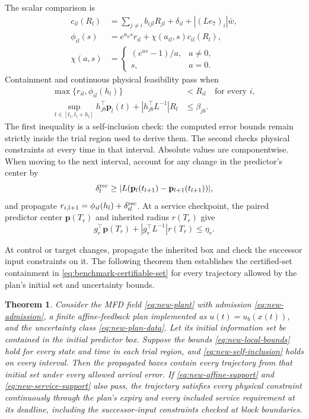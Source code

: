 \documentclass[preprint,12pt]{elsarticle}
\theoremstyle{definition}
\theoremstyle{plain}
\newtheorem{theorem}{Theorem}
\theoremstyle{definition}
\theoremstyle{plain}
\begin{document}
The scalar comparison is
\begin{align}
 c_{il}(R_l)&=\sum_{j\ne i}b_{ijl}R_{jl}
                  +\delta_{il}+|(Le_7)_i|\bar w,\nonumber\\
 \phi_{il}(s)&=e^{a_{il}s}r_{il}
                   +\chi(a_{il},s)c_{il}(R_l),\nonumber\\
 \chi(a,s)&=\begin{cases}(e^{as}-1)/a,&a\ne0,\\s,&a=0.\end{cases}
 \label{eq:new-component-comparison}
\end{align}
Containment and continuous physical feasibility pass when
\begin{align}
 \max\{r_{il},\phi_{il}(h_l)\}&<R_{il}\quad\text{for every }i,
 \label{eq:new-self-inclusion}\\
 \sup_{t\in[t_l,t_l+h_l]}h_{jb}^\top \mathbf{p}_l(t)
       +|h_{jb}^\top L^{-1}|R_l&\le\beta_{jb}.
 \label{eq:new-affine-support}
\end{align}
The first inequality is a self-inclusion check: the computed error bounds
remain strictly inside the trial region used to derive them. The second
checks physical constraints at every time in that interval. Absolute values
are componentwise. When moving to the next interval, account for any
change in the predictor's center by
\begin{equation}
 \delta^{\rm rec}_l\ge
 |L(\mathbf{p}_l(t_{l+1})-\mathbf{p}_{l+1}(t_{l+1}))|,
 \label{eq:new-recentering-bound}
\end{equation}
and propagate $r_{i,l+1}=\phi_{il}(h_l)+\delta^{\rm rec}_{il}$. At a service checkpoint, the paired predictor center $\mathbf p(T_r)$
and inherited radius $r(T_r)$ give
\begin{equation}
 g_r^\top\mathbf p(T_r)+|g_r^\top L^{-1}|r(T_r)\le\eta_r.
 \label{eq:new-service-support}
\end{equation}

At control or target changes, propagate the inherited box and check
the successor input constraints on it. The following theorem then
establishes the certified-set containment in
\eqref{eq:benchmark-certifiable-set} for every trajectory allowed by
the plan's initial set and uncertainty bounds.

\begin{theorem}
\label{thm:new-plan-enclosure}
Consider the MFD field \eqref{eq:new-plant} with admission
\eqref{eq:new-admission}, a finite affine-feedback plan implemented as
$u(t)=u_b(x(t))$, and the uncertainty
class \eqref{eq:new-plan-data}. Let its initial information set be contained
in the initial predictor box. Suppose the bounds
\eqref{eq:new-local-bounds} hold for every state and time in each trial
region, and
\eqref{eq:new-self-inclusion} holds on every interval. Then the propagated
boxes contain every trajectory from that initial set under every allowed
arrival error. If \eqref{eq:new-affine-support} and
\eqref{eq:new-service-support} also pass, the trajectory satisfies every
physical constraint continuously through the plan's expiry and every included
service requirement at its deadline, including the successor-input
constraints checked at block boundaries.
\end{theorem}
\end{document}

